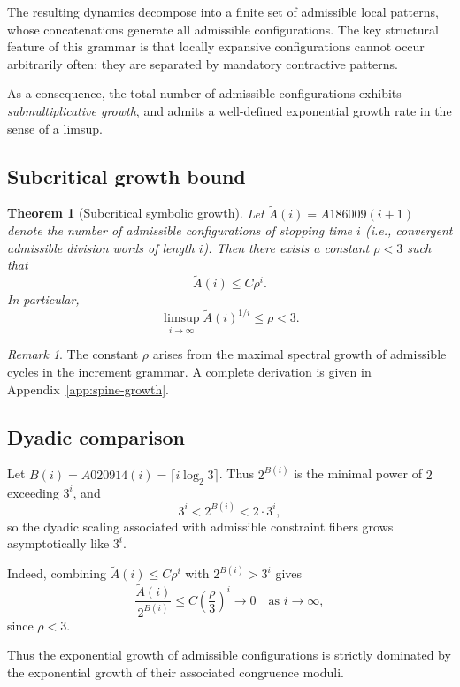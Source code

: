 \documentclass[12pt, oneside]{article}
\numberwithin{equation}{section}
\theoremstyle{definition}
\theoremstyle{plain}
\newtheorem{theorem}{Theorem}[section]
\theoremstyle{remark}
\newtheorem*{remark}{Remark}
\begin{document}
The resulting dynamics decompose into a finite set of admissible local patterns,
whose concatenations generate all admissible configurations. The key structural
feature of this grammar is that locally expansive configurations cannot occur
arbitrarily often: they are separated by mandatory contractive patterns.

As a consequence, the total number of admissible configurations exhibits
\emph{submultiplicative growth}, and admits a well-defined exponential growth
rate in the sense of a limsup.

\subsection{Subcritical growth bound}

\begin{theorem}[Subcritical symbolic growth]
\label{thm:subcritical-growth}
Let $\widetilde A(i) = A186009(i+1)$ denote the number of admissible configurations
of stopping time $i$ (i.e., convergent admissible division words of length $i$).
Then there exists a constant $\rho < 3$ such that
\[
\widetilde A(i) \le C \rho^i.
\]
In particular,
\[
\limsup_{i\to\infty} \widetilde A(i)^{1/i} \le \rho < 3.
\]
\end{theorem}

\begin{remark}
The constant $\rho$ arises from the maximal spectral growth of admissible
cycles in the increment grammar. A complete derivation is given in
Appendix~\ref{app:spine-growth}.
\end{remark}

\subsection{Dyadic comparison}

Let $B(i) = A020914(i) = \lceil i \log_2 3 \rceil$. Thus $2^{B(i)}$ is the minimal
power of $2$ exceeding $3^i$, and
\[
3^i < 2^{B(i)} < 2 \cdot 3^i,
\]
so the dyadic scaling associated with admissible constraint fibers grows
asymptotically like $3^i$.

Indeed, combining $\widetilde A(i) \le C\rho^i$ with $2^{B(i)} > 3^i$ gives
\[
\frac{\widetilde A(i)}{2^{B(i)}} \le C\left(\frac{\rho}{3}\right)^i \to 0
 \quad \text{as } i \to \infty,
\]
since $\rho < 3$.

Thus the exponential growth of admissible configurations is strictly dominated
by the exponential growth of their associated congruence moduli.
\end{document}
